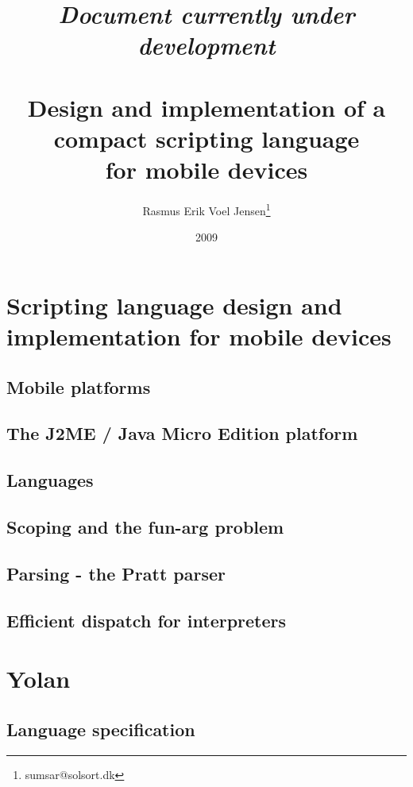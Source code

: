 \documentclass[11pt]{report}
\title{
\emph{Document currently under development} \\ ~ \\
Design and implementation of a \\
compact scripting language \\ 
for mobile devices}
\author{
  Rasmus Erik Voel Jensen\footnote{
    sumsar@solsort.dk
  }
}
\date{2009}
\begin{document}


\setcounter{tocdepth}{1}
\tableofcontents
%

\part{Scripting language design and implementation for mobile devices}
  \chapter{Mobile platforms}
    
  \chapter{The J2ME / Java Micro Edition platform}
  \chapter{Languages}
    
  \chapter{Scoping and the fun-arg problem}
  \chapter{Parsing - the Pratt parser}
    
  \chapter{Efficient dispatch for interpreters}
\part{Yolan}
  \chapter{Language specification}
\end{document}

